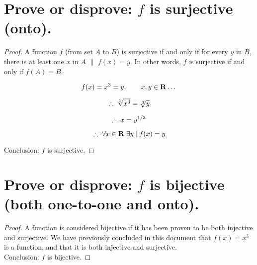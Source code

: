 \documentclass{article}
\begin{document}
\section{Prove or disprove: $f$ is surjective (onto).}
\begin{proof}

A function $f$ (from set $A$ to $B$) is surjective if and only if for every $y$ in $B$, there is at least one $x$ in $A$ $\|$ $f(x) = y$. In other words, $f$ is surjective if and only if $f(A) = B$. 

\begin{equation}
f(x) = x^3 = y , \qquad x , y \in \mathbf{R} \ldots \\
\end{equation}

\begin{equation}
\therefore \;
\sqrt[3]{x^3} = \sqrt[3]{y}\qquad \\
\end{equation}

\begin{equation}
\therefore \; 
x = y^{1/3} \\
\end{equation}

\begin{equation}
\therefore \; \forall x \in \mathbf{R} \; \exists y \; \| f(x) = y  \\
\end{equation}

Conclusion: $f$ is surjective.

\end{proof}

\section{Prove or disprove: $f$ is bijective (both one-to-one and onto).}
\begin{proof}

A function is considered bijective if it has been proven to be both injective and surjective. We have previously concluded in this document that $f(x) = x^3$ is a function, and that it is both injective and surjective. \\

Conclusion: $f$ is bijective.
\end{proof}
\end{document}
